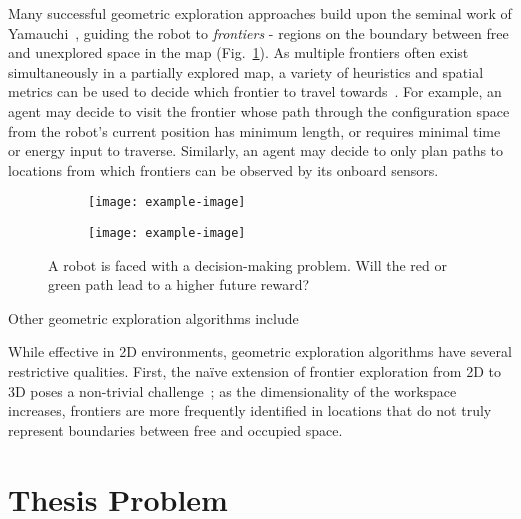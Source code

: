 Many successful geometric exploration approaches build upon the seminal work of
Yamauchi~\cite{yamauchi1997frontier}, guiding the robot to \textit{frontiers} - regions on the boundary
between free and unexplored space in the map (Fig.~\ref{fig:frontiers}).
As multiple frontiers often exist simultaneously in a partially explored map, a
variety of heuristics and spatial metrics can be used to decide which frontier to
travel towards~\cite{lavalle2006planning}. For example, an agent may decide to
visit the frontier whose path through the configuration space from the robot's current
position has minimum length, or requires minimal time or energy input to
traverse. Similarly, an agent may decide to only plan paths to locations
from which frontiers can be observed by its onboard sensors.

\begin{figure}
  \centering
  \begin{subfigure}[t]{0.45\textwidth}
    \centering
    \texttt{[image: example-image]}
    \caption{\label{fig:frontiers}}
  \end{subfigure}
  \hfill
  \begin{subfigure}[t]{0.45\textwidth}
    \centering
    \texttt{[image: example-image]}
    \caption{\label{fig:info-theoretic}}
  \end{subfigure}
  \caption{A robot is faced with a decision-making problem. Will the red or
    green path lead to a higher future reward? \label{fig:exploration_strategies}}
\end{figure}

Other geometric exploration algorithms include

While effective in 2D environments, geometric exploration algorithms have
several restrictive qualities. First, the na\"{i}ve extension of frontier exploration
from 2D to 3D poses a non-trivial challenge~\cite{shen20113d}; as the
dimensionality of the workspace increases, frontiers are more frequently identified in
locations that do not truly represent boundaries between free and occupied
space.


\section{Thesis Problem}

\begin{center}  \end{center}

